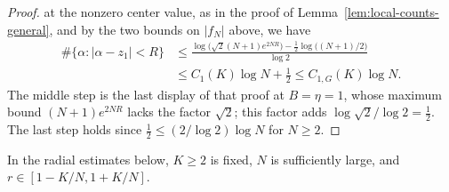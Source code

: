 \begin{proof}
\cite[\S3.61]{Titchmarsh1939} at the nonzero center value, as in the
proof of Lemma~\ref{lem:local-counts-general}, and by the two bounds on
$|f_N|$ above, we have
\begin{align*}
 \#\{\alpha:|\alpha-z_1|<R\}
 &\le\frac{\log\bigl(\sqrt2(N+1)e^{2NR}\bigr)
   -\tfrac12\log\bigl((N+1)/2\bigr)}{\log2}\\
 &\le C_1(K)\log N+\frac12
 \le C_{1,G}(K)\log N.
\end{align*}
The middle step is the last display of that proof at $B=\eta=1$, whose
maximum bound $(N+1)e^{2NR}$ lacks the factor $\sqrt2$; this factor adds
$\log\sqrt2/\log2=\tfrac12$. The last step holds since
$\tfrac12\le(2/\log2)\log N$ for $N\ge2$.
\end{proof}

In the radial estimates below, $K\ge2$ is fixed, $N$ is sufficiently
large, and $r\in[1-K/N,1+K/N]$.

